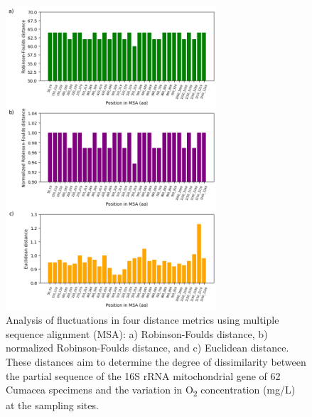 {\begin{figure}[]
    \centering
    \includegraphics[width=0.7\textwidth]{figure6.png}
    \caption{Analysis of fluctuations in four distance metrics using multiple sequence alignment (MSA): a) Robinson-Foulds distance, b) normalized Robinson-Foulds distance, and c) Euclidean distance. These distances aim to determine the degree of dissimilarity between the partial sequence of the 16S rRNA mitochondrial gene of 62 Cumacea specimens and the variation in O\textsubscript{2} concentration (mg/L) at the sampling sites. \label{fig:fig8}}
\end{figure}

}
